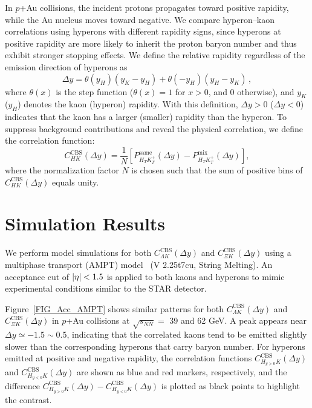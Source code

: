 \documentclass[a4paper,12pt]{article}
\begin{document}
In $p$+Au collisions, the incident protons propagates toward positive rapidity, while the Au nucleus moves toward negative.
We compare hyperon–kaon correlations using hyperons with different rapidity signs, since hyperons at positive rapidity are more likely to inherit the proton baryon number and thus exhibit stronger stopping effects. We define the relative rapidity regardless of the emission direction of hyperons as
\begin{equation}
  \Delta y = \theta(y_H)(y_K-y_H) + \theta(-y_H)(y_H-y_K) \, ,
\end{equation}
where $\theta(x)$ is the step function ($\theta(x)=1$ for $x>0$, and 0 otherwise), and $y_K$ ($y_H$) denotes the kaon (hyperon) rapidity. With this definition, $\Delta y > 0$ ($\Delta y < 0$) indicates that the kaon has a larger (smaller) rapidity than the hyperon.
To suppress background contributions and reveal the physical correlation, we define the correlation function:
\begin{equation}
  C^{\text{CBS}}_{HK}(\Delta y) =
  \frac{1}{N}\left[
  P^{\text{same}}_{H_T K^+_T}(\Delta y) -
  P^{\text{mix}}_{H_T K^+_T}(\Delta y)
  \right] ,
\end{equation}
where the normalization factor $N$ is chosen such that the sum of positive bins of $C^{\text{CBS}}_{HK}(\Delta y)$ equals unity.

\section{Simulation Results}

We perform model simulations for both $C^{\text{CBS}}_{\Lambda K}(\Delta y)$ and $C^{\text{CBS}}_{\Xi K}(\Delta y)$ using a multiphase transport (AMPT) model~\cite{Lin:2004en} (V 2.25t7cu, String Melting).  
An acceptance cut of $\string| \eta \string| < 1.5$ is applied to both kaons and hyperons to mimic experimental conditions similar to the STAR detector.

Figure~\ref{FIG_Acc_AMPT} shows similar patterns for both $C^{\text{CBS}}_{\Lambda K}(\Delta y)$ and $C^{\text{CBS}}_{\Xi K}(\Delta y)$ in $p$+Au collisions at $\sqrt{s_{NN}}=$ 39 and 62 GeV.  
A peak appears near $\Delta y \simeq -1.5 \sim 0.5$, indicating that the correlated kaons tend to be emitted slightly slower than the corresponding hyperons that carry baryon number.  
For hyperons emitted at positive and negative rapidity, the correlation functions $C^{\text{CBS}}_{H_{y>0}K}(\Delta y)$ and $C^{\text{CBS}}_{H_{y<0}K}(\Delta y)$ are shown as blue and red markers, respectively, and the difference $C^{\text{CBS}}_{H_{y>0}K}(\Delta y) - C^{\text{CBS}}_{H_{y<0}K}(\Delta y)$ is plotted as black points to highlight the contrast.
\end{document}
